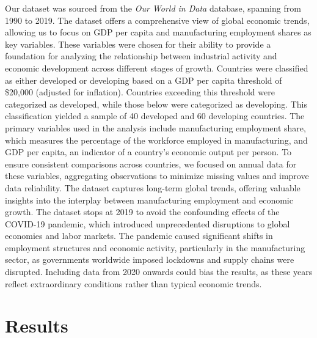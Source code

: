 \documentclass[12pt]{article}
\begin{document}
Our dataset was sourced from the \textit{Our World in Data} database, spanning from 1990 to 2019. The dataset offers a comprehensive view of global economic trends, allowing us to focus on GDP per capita and manufacturing employment shares as key variables. These variables were chosen for their ability to provide a foundation for analyzing the relationship between industrial activity and economic development across different stages of growth.
    Countries were classified as either developed or developing based on a GDP per capita threshold of \$20,000 (adjusted for inflation). Countries exceeding this threshold were categorized as developed, while those below were categorized as developing. This classification yielded a sample of 40 developed and 60 developing countries. The primary variables used in the analysis include manufacturing employment share, which measures the percentage of the workforce employed in manufacturing, and GDP per capita, an indicator of a country's economic output per person. 
    To ensure consistent comparisons across countries, we focused on annual data for these variables, aggregating observations to minimize missing values and improve data reliability. The dataset captures long-term global trends, offering valuable insights into the interplay between manufacturing employment and economic growth.
    The dataset stops at 2019 to avoid the confounding effects of the COVID-19 pandemic, which introduced unprecedented disruptions to global economies and labor markets. The pandemic caused significant shifts in employment structures and economic activity, particularly in the manufacturing sector, as governments worldwide imposed lockdowns and supply chains were disrupted. Including data from 2020 onwards could bias the results, as these years reflect extraordinary conditions rather than typical economic trends.

\section{Results}
\label{sec:result}
\end{document}
